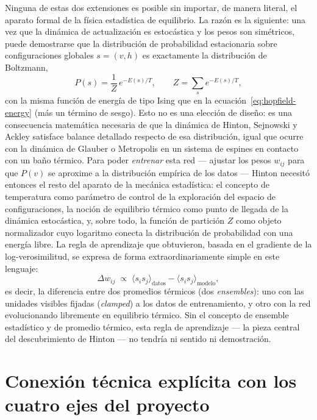 \documentclass[12pt]{article}
\begin{document}
Ninguna de estas dos extensiones es posible sin importar, de manera literal, el aparato formal de la física estadística de equilibrio. La razón es la siguiente: una vez que la dinámica de actualización es estocástica y los pesos son simétricos, puede demostrarse que la distribución de probabilidad estacionaria sobre configuraciones globales $s=(v,h)$ es exactamente la distribución de Boltzmann,
\begin{equation}
P(s) = \frac{1}{Z}\, e^{-E(s)/T}, \qquad Z = \sum_{s} e^{-E(s)/T},
\end{equation}
con la misma función de energía de tipo Ising que en la ecuación~\eqref{eq:hopfield-energy} (más un término de sesgo). Esto no es una elección de diseño: es una consecuencia matemática necesaria de que la dinámica de Hinton, Sejnowski y Ackley satisface balance detallado respecto de esa distribución, igual que ocurre con la dinámica de Glauber o Metropolis en un sistema de espines en contacto con un baño térmico. Para poder \emph{entrenar} esta red --- ajustar los pesos $w_{ij}$ para que $P(v)$ se aproxime a la distribución empírica de los datos --- Hinton necesitó entonces el resto del aparato de la mecánica estadística: el concepto de temperatura como parámetro de control de la exploración del espacio de configuraciones, la noción de equilibrio térmico como punto de llegada de la dinámica estocástica, y, sobre todo, la función de partición $Z$ como objeto normalizador cuyo logaritmo conecta la distribución de probabilidad con una energía libre. La regla de aprendizaje que obtuvieron, basada en el gradiente de la log-verosimilitud, se expresa de forma extraordinariamente simple en este lenguaje:
\begin{equation}
\Delta w_{ij} \;\propto\; \langle s_i s_j \rangle_{\text{datos}} - \langle s_i s_j \rangle_{\text{modelo}} ,
\label{eq:cd-rule}
\end{equation}
es decir, la diferencia entre dos promedios térmicos (dos \emph{ensembles}): uno con las unidades visibles fijadas (\emph{clamped}) a los datos de entrenamiento, y otro con la red evolucionando libremente en equilibrio térmico. Sin el concepto de ensemble estadístico y de promedio térmico, esta regla de aprendizaje --- la pieza central del descubrimiento de Hinton --- no tendría ni sentido ni demostración.

\section{Conexión técnica explícita con los cuatro ejes del proyecto}
\end{document}
